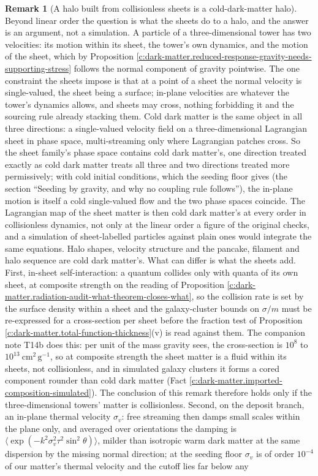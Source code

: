 \documentclass[11pt]{article}
\theoremstyle{definition}
\newtheorem{remark}[theorem]{Remark}
\theoremstyle{plain}
\begin{document}
\begin{remark}[A halo built from collisionless sheets is a cold-dark-matter halo]\label{c:note.dark-matter.halo-built-collisionless-sheets-cold-dark}
Beyond linear order the question is what the sheets do to a halo, and the answer is an argument, not a simulation. A particle of a three-dimensional tower has two velocities: its motion within its sheet, the tower's own dynamics, and the motion of the sheet, which by Proposition \ref{c:dark-matter.reduced-response-gravity-needs-supporting-stress} follows the normal component of gravity pointwise. The one constraint the sheets impose is that at a point of a sheet the normal velocity is single-valued, the sheet being a surface; in-plane velocities are whatever the tower's dynamics allows, and sheets may cross, nothing forbidding it and the sourcing rule already stacking them. Cold dark matter is the same object in all three directions: a single-valued velocity field on a three-dimensional Lagrangian sheet in phase space, multi-streaming only where Lagrangian patches cross. So the sheet family's phase space contains cold dark matter's, one direction treated exactly as cold dark matter treats all three and two directions treated more permissively; with cold initial conditions, which the seeding floor gives (the section ``Seeding by gravity, and why no coupling rule follows''), the in-plane motion is itself a cold single-valued flow and the two phase spaces coincide. The Lagrangian map of the sheet matter is then cold dark matter's at every order in collisionless dynamics, not only at the linear order a figure of the original checks, and a simulation of sheet-labelled particles against plain ones would integrate the same equations. Halo shapes, velocity structure and the pancake, filament and halo sequence are cold dark matter's. What can differ is what the sheets add. First, in-sheet self-interaction: a quantum collides only with quanta of its own sheet, at composite strength on the reading of Proposition \ref{c:dark-matter.radiation-audit-what-theorem-closes-what}, so the collision rate is set by the surface density within a sheet and the galaxy-cluster bounds on $\sigma/m$ must be re-expressed for a cross-section per sheet before the fraction test of Proposition \ref{c:dark-matter.total-function-thickness}(v) is read against them. The companion note T14b does this: per unit of the mass gravity sees, the cross-section is $10^{8}$ to $10^{13}\ \mathrm{cm^{2}\,g^{-1}}$, so at composite strength the sheet matter is a fluid within its sheets, not collisionless, and in simulated galaxy clusters it forms a cored component rounder than cold dark matter (Fact \ref{c:dark-matter.imported-composition-simulated}). The conclusion of this remark therefore holds only if the three-dimensional towers' matter is collisionless. Second, on the deposit branch, an in-plane thermal velocity $\sigma_{v}$: free streaming then damps small scales within the plane only, and averaged over orientations the damping is $\langle\exp(-k^{2}\sigma_{v}^{2}\tau^{2}\sin^{2}\theta)\rangle$, milder than isotropic warm dark matter at the same dispersion by the missing normal direction; at the seeding floor $\sigma_{v}$ is of order $10^{-4}$ of our matter's thermal velocity and the cutoff lies far below any 
\end{remark}
\end{document}
